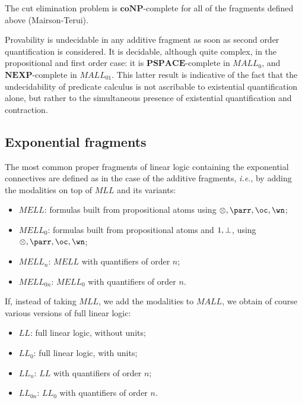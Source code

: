 The cut elimination problem is \(\mathbf{coNP}\)-complete for all of the
fragments defined above (Mairson-Terui).

Provability is undecidable in any additive fragment as soon as second
order quantification is considered. It is decidable, although quite
complex, in the propositional and first order case: it is
\(\mathbf{PSPACE}\)-complete in \(MALL_0\), and
\(\mathbf{NEXP}\)-complete in \(MALL_{01}\). This latter result is
indicative of the fact that the undecidability of predicate calculus is
not ascribable to existential quantification alone, but rather to the
simultaneous presence of existential quantification and contraction.

\subsection{Exponential fragments}\label{exponential-fragments}

The most common proper fragments of linear logic containing the
exponential connectives are defined as in the case of the additive
fragments, \emph{i.e.}, by adding the modalities on top of \(MLL\) and
its variants:

\begin{itemize}
\tightlist
\item
  \(MELL\): formulas built from propositional atoms using
  \(\tens,\parr,\oc,\wn\);
\item
  \(MELL_0\): formulas built from propositional atoms and \(1,\bot\),
  using \(\tens,\parr,\oc,\wn\);
\item
  \(MELL_n\): \(MELL\) with quantifiers of order \(n\);
\item
  \(MELL_{0n}\): \(MELL_0\) with quantifiers of order \(n\).
\end{itemize}

If, instead of taking \(MLL\), we add the modalities to \(MALL\), we
obtain of course various versions of full linear logic:

\begin{itemize}
\tightlist
\item
  \(LL\): full linear logic, without units;
\item
  \(LL_0\): full linear logic, with units;
\item
  \(LL_n\): \(LL\) with quantifiers of order \(n\);
\item
  \(LL_{0n}\): \(LL_0\) with quantifiers of order \(n\).
\end{itemize}

